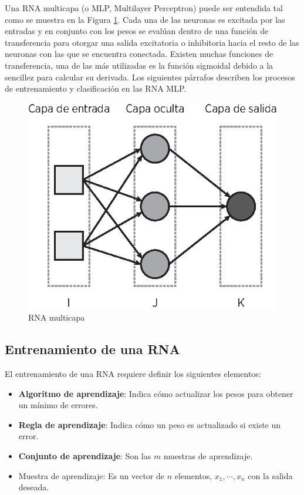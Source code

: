 \documentclass[journal]{IEEEtran}
\begin{document}
Una RNA multicapa (o MLP, Multilayer Perceptron) puede ser entendida tal como se muestra en la Figura \ref{fig:rna-mlp}.
Cada una de las neuronas es excitada por las entradas y en conjunto con los pesos se evalúan dentro de una función de transferencia para otorgar una salida excitatoria o inhibitoria hacia el resto de las neuronas con las que se encuentra conectada.
Existen muchas funciones de transferencia, una de las más utilizadas es la función sigmoidal debido a la sencillez para calcular su derivada.
Los siguientes párrafos describen los procesos de entrenamiento y clasificación en las RNA MLP.
\begin{figure}[tb]
	\centering
	\includegraphics[scale=0.75]{imagenes/mlp}
	\caption{RNA multicapa}
	\label{fig:rna-mlp}
\end{figure}

\subsection{Entrenamiento de una RNA} %
\label{sub:entrenamiento_de_una_RNA}
El entrenamiento de una RNA requiere definir los siguientes elementos:
\begin{itemize}
	\item \textbf{Algoritmo de aprendizaje}: Indica cómo actualizar los pesos para obtener un mínimo de errores.
	\item \textbf{Regla de aprendizaje}: Indica cómo un peso es actualizado si existe un error.
	\item \textbf{Conjunto de aprendizaje}: Son las $m$ muestras de aprendizaje.
	\item Muestra de aprendizaje: Es un vector de $n$ elementos, $x_1, \cdots, x_n$ con la salida deseada. 
\end{itemize}
\end{document}

